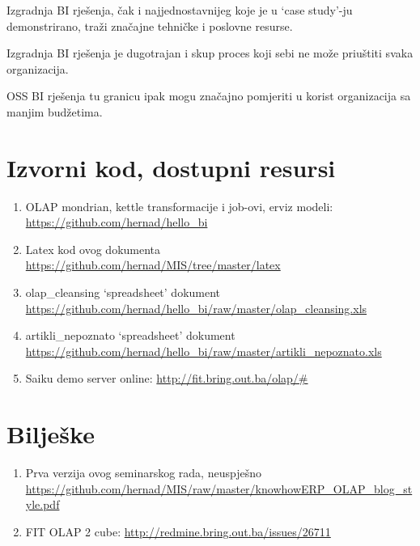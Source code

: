 \documentclass[times, utf8, seminar]{fit}
\begin{document}
Izgradnja BI rješenja, čak i najjednostavnijeg koje je u `case study'-ju demonstrirano, traži značajne tehničke i poslovne resurse. 

Izgradnja BI rješenja je dugotrajan i skup proces koji sebi ne može priuštiti svaka organizacija. 

OSS BI rješenja tu granicu ipak mogu značajno pomjeriti u korist organizacija sa manjim budžetima.




\appendix

\chapter{Izvorni kod, dostupni resursi}
\label{chap:izvorni_kod}

\begin{enumerate}[labelindent=\parindent,leftmargin=*]
   \item OLAP mondrian, kettle transformacije i job-ovi, erviz modeli: \url{https://github.com/hernad/hello_bi}
   \item Latex kod ovog dokumenta \url{https://github.com/hernad/MIS/tree/master/latex}
   \item olap\_cleansing `spreadsheet' dokument \url{https://github.com/hernad/hello_bi/raw/master/olap_cleansing.xls}
   \item artikli\_nepoznato `spreadsheet' dokument \url{https://github.com/hernad/hello_bi/raw/master/artikli_nepoznato.xls}
   \item Saiku demo server online: \url{http://fit.bring.out.ba/olap/#}
\end{enumerate}

\chapter{Bilješke}
\label{chap:biljeske}

\begin{enumerate}
  \item Prva verzija ovog seminarskog rada, neuspješno \url{https://github.com/hernad/MIS/raw/master/knowhowERP_OLAP_blog_style.pdf}
  \item FIT OLAP 2 cube: \url{http://redmine.bring.out.ba/issues/26711}
\end{enumerate}
\end{document}
